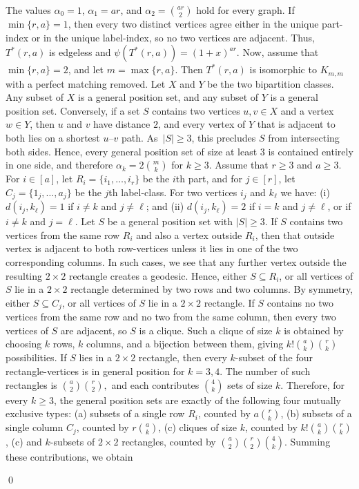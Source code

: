 \documentclass[12pt,twoside]{article}
\renewenvironment{proof}{{\noindent\bfseries Proof.}}{\qed}
\begin{document}
		\begin{proof}
			The values $\alpha_0=1$, $\alpha_1=ar$, and $\alpha_2=\binom{ar}{2}$ hold for every graph. 	If $\min\{r,a\}=1$, then every two distinct vertices agree either in the unique part-index or in the unique label-index, so no two vertices are adjacent. Thus, $T^*(r,a)$ is edgeless and $\psi(T^*(r,a))=(1+x)^{ar}$. Now, assume that $\min\{r,a\}=2$, and let $m=\max\{r,a\}$. Then $T^*(r,a)$ is isomorphic to $K_{m,m}$ with a perfect matching removed. Let $X$ and $Y$ be the two bipartition classes. Any subset of $X$ is a general position set, and any subset of $Y$ is a general position set. Conversely, if a set $S$ contains two vertices $u,v\in X$ and a vertex $w\in Y$, then $u$ and $v$ have distance $2$, and every vertex of $Y$ that is adjacent to both lies on a shortest $u$--$v$ path. As $|S| \ge 3$, this precludes $S$ from intersecting both sides. Hence, every general position set of size at least $3$ is contained entirely in one side, and therefore
			$ \alpha_k=2\binom{m}{k}$ for $k\ge 3.$ Assume that $r\ge 3$ and $a\ge 3$. For $i\in [a]$, let
			$R_i=\{ i_1,\dots,i_r \}$ be the $i$th part, and for $j\in [r]$, let $C_j=\{ 1_j,\dots,a_j \}$	be the $j$th label-class. For two vertices $i_j$ and $k_\ell$ we have: (i) $d(i_j,k_\ell)=1$ if $i\neq k$ and $j\neq \ell$; and (ii) $d(i_j,k_\ell)=2$ if $i=k$ and $j\neq \ell$, or if $i\neq k$ and $j=\ell$. Let $S$ be a general position set with $|S|\ge 3$.	If $S$ contains two vertices from the same row $R_i$ and also a vertex outside $R_i$, then that outside vertex is adjacent to both row-vertices unless it lies in one of the two corresponding columns. In such cases, we see that any further vertex outside the resulting $2\times 2$ rectangle creates a geodesic. Hence, either $S\subseteq R_i$, or all vertices of $S$ lie in a $2\times 2$ rectangle determined by two rows and two columns. By symmetry, either $S\subseteq C_j$, or all vertices of $S$ lie in a $2\times 2$ rectangle.
			 If $S$ contains no two vertices from the same row and no two from the same column, then every two vertices of $S$ are adjacent, so $S$ is a clique. Such a clique of size $k$ is obtained by choosing $k$ rows, $k$ columns, and a bijection between them, giving $k!\binom{a}{k}\binom{r}{k}$	possibilities. If $S$ lies in a $2\times 2$ rectangle, then every $k$-subset of the four rectangle-vertices is in general position for $k=3,4$. The number of such rectangles is
			$\binom{a}{2}\binom{r}{2},$	and each contributes $\binom{4}{k}$ sets of size $k$. Therefore, for every $k\ge 3$, the general position sets are exactly of the following four mutually exclusive types: (a)  subsets of a single row $R_i$, counted by $a\binom{r}{k}$, (b)  subsets of a single column $C_j$, counted by $r\binom{a}{k}$, (c)   cliques of size $k$, counted by $k!\binom{a}{k}\binom{r}{k}$, (c) and   $k$-subsets of $2\times 2$ rectangles, counted by $\binom{a}{2}\binom{r}{2}\binom{4}{k}$. Summing these contributions, we obtain

\end{proof}
\end{document}
